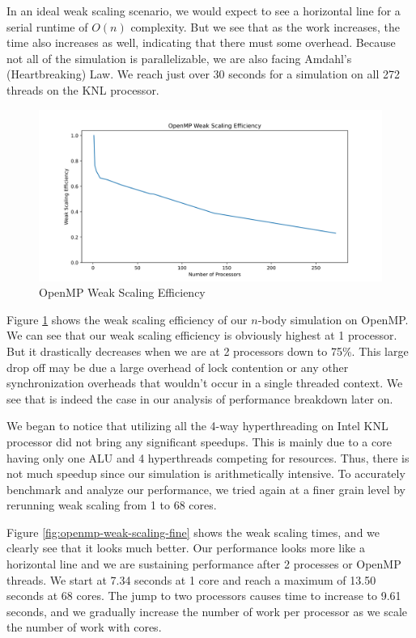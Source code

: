 \documentclass{article}
\begin{document}
In an ideal weak scaling scenario, we would expect to see a horizontal line for a serial runtime of $O(n)$ complexity. But we see that as the work increases, the time also increases as well, indicating that there must some overhead. Because not all of the simulation is parallelizable, we are also facing Amdahl's (Heartbreaking) Law. We reach just over 30 seconds for a simulation on all 272 threads on the KNL processor.

\begin{figure}[H]
	\centering
	\includegraphics[width=6in]{figures/openmp_weak_scaling_efficiency.png}
	\caption{OpenMP Weak Scaling Efficiency}
	\label{fig:openmp-weak-scaling-efficiency}
\end{figure}

Figure \ref{fig:openmp-weak-scaling-efficiency} shows the weak scaling efficiency of our $n$-body simulation on OpenMP. We can see that our weak scaling efficiency is obviously highest at 1 processor. But it drastically decreases when we are at 2 processors down to 75\%. This large drop off may be due a large overhead of lock contention or any other synchronization overheads that wouldn't occur in a single threaded context. We see that is indeed the case in our analysis of performance breakdown later on.

We began to notice that utilizing all the 4-way hyperthreading on Intel KNL processor did not bring any significant speedups. This is mainly due to a core having only one ALU and 4 hyperthreads competing for resources. Thus, there is not much speedup since our simulation is arithmetically intensive. To accurately benchmark and analyze our performance, we tried again at a finer grain level by rerunning weak scaling from 1 to 68 cores.

Figure \ref{fig:openmp-weak-scaling-fine} shows the weak scaling times, and we clearly see that it looks much better. Our performance looks more like a horizontal line and we are sustaining performance after 2 processes or OpenMP threads. We start at 7.34 seconds at 1 core and reach a maximum of 13.50 seconds at 68 cores. The jump to two processors causes time to increase to 9.61 seconds, and we gradually increase the number of work per processor as we scale the number of work with cores.
\end{document}

